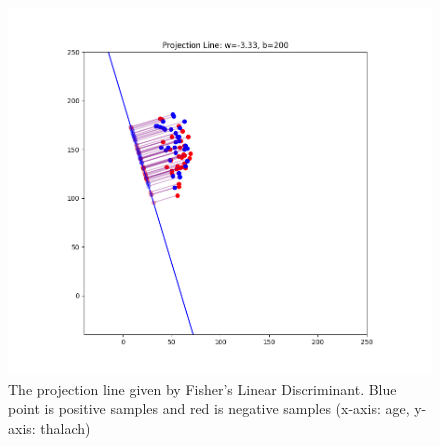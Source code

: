 \documentclass[twocolumn]{extarticle}
\begin{document}
\begin{enumerate}
\begin{figure}[H]
\centering
\includegraphics[width=0.95\linewidth]{fisher}
\caption{The projection line given by Fisher's Linear Discriminant. Blue point is positive samples and red is negative samples (x-axis: age, y-axis: thalach)}
\label{fig:fisher}
\end{figure}

\end{enumerate}
\end{document}
